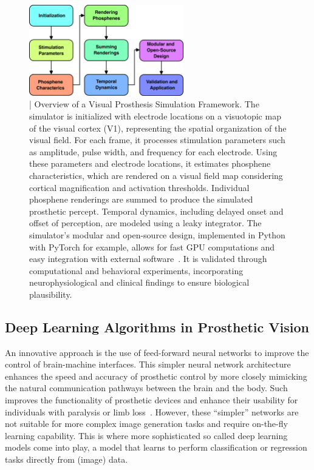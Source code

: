 \documentclass[twocolumn,10pt]{article}
\begin{document}
\begin{figure}[ht!]
      \centering
      \includegraphics[width=0.6\textwidth]{imgs/block_diagram_vis_prost.png}
      \caption{| Overview of a Visual Prosthesis Simulation Framework. The
            simulator is initialized with electrode locations on a visuotopic
            map of the visual cortex (V1), representing the spatial organization
            of the visual field. For each frame, it processes stimulation
            parameters such as amplitude, pulse width, and frequency for each
            electrode. Using these parameters and electrode locations, it
            estimates phosphene characteristics, which are rendered on a visual
            field map considering cortical magnification and activation
            thresholds. Individual phosphene renderings are summed to produce
            the simulated prosthetic percept. Temporal dynamics, including
            delayed onset and offset of perception, are modeled using a leaky
            integrator. The simulator's modular and open-source design,
            implemented in Python with PyTorch for example, allows for fast GPU
            computations and easy integration with external
            software~\parencite{deruytervansteveninckEndtoendOptimizationProsthetic2022}.
            It is validated through computational and behavioral experiments,
            incorporating neurophysiological and clinical findings to ensure
            biological plausibility.}\label{fig:simulator_framework}
\end{figure}

\subsection*{Deep Learning Algorithms in Prosthetic Vision}
An innovative approach is the use of feed-forward neural networks to improve the
control of brain-machine interfaces. This simpler neural network architecture
enhances the speed and accuracy of prosthetic control by more closely mimicking
the natural communication pathways between the brain and the body. Such improves
the functionality of prosthetic devices and enhance their usability for
individuals with paralysis or limb
loss~\parencite{willseyRealtimeBrainmachineInterface2022}. However, these
``simpler'' networks are not suitable for more complex image generation tasks
and require on-the-fly learning capability. This is where more sophisticated so
called deep learning models come into play, a model that learns to perform
classification or regression tasks directly from (image) data.
\end{document}
